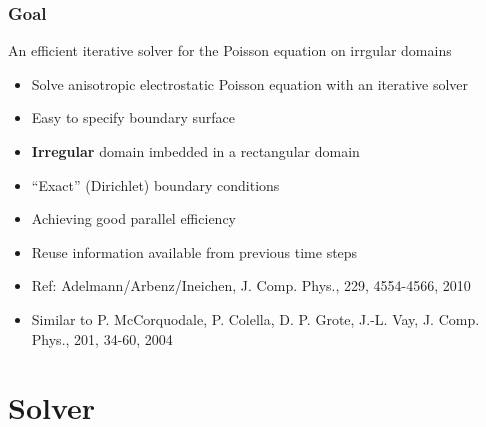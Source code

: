 \documentclass[xcolor=pdftex,table,10pt]{beamer}
\begin{document}
	\begin{frame}
		\frametitle{Goal}

		\begin{alertblock}{An efficient iterative solver for the Poisson equation on irrgular domains}
		\begin{itemize}
			\item Solve anisotropic electrostatic Poisson equation with an iterative solver
            \item Easy to specify boundary surface
			\item \alert{\textbf{Irregular}} domain imbedded in a rectangular domain
            \item ``Exact'' (Dirichlet) boundary conditions %
            \item Achieving good parallel efficiency
            \item Reuse information available from previous time steps
            \item Ref: Adelmann/Arbenz/Ineichen, J. Comp. Phys., 229, 4554-4566, 2010
            \item Similar to P. McCorquodale, P. Colella, D. P. Grote, J.-L. Vay, J. Comp. Phys., 201, 34-60, 2004
		\end{itemize}
		\end{alertblock}

	\end{frame}
	
    \section{Solver}
\end{document}
